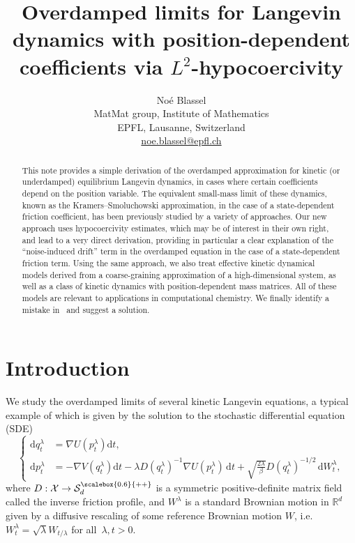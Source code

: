 \documentclass[10pt]{article}
\title{Overdamped limits for Langevin dynamics with position-dependent coefficients via $L^2$-hypocoercivity}
\author{No\'e Blassel\\
   \small{MatMat group, Institute of Mathematics}\\\small{EPFL, Lausanne, Switzerland}  \\
   \small{\href{mailto:noe.blassel@epfl.ch}{noe.blassel@epfl.ch}}
}
\renewcommand{\d}{\mathrm{d}}
\newcommand{\R}{\mathbb{R}}
\newcommand{\cX}{\mathcal{X}}
\newcommand{\cSpd}{\mathcal{S}_d^{\scalebox{0.6}{++}}}
\newcommand{\1}{\mathbbm 1}
\begin{document}
\maketitle

\begin{abstract}
    This note provides a simple derivation of the overdamped approximation for kinetic (or underdamped) equilibrium Langevin dynamics, in cases where certain coefficients depend on the position variable.
    The equivalent small-mass limit of these dynamics, known as the Kramers--Smoluchowski approximation, in the case of a state-dependent friction coefficient, has been previously studied by a variety of approaches.
    Our new approach uses hypocoercivity estimates, which may be of interest in their own right, and lead to a very direct derivation, providing in particular a clear explanation of the ``noise-induced drift'' term in the overdamped equation in the case of a state-dependent friction term.
    Using the same approach, we also treat effective kinetic dynamical models derived from a coarse-graining approximation of a high-dimensional system, as well as a class of kinetic dynamics with position-dependent mass matrices. All of these models are relevant to applications in computational chemistry.
    We finally identify a mistake in~\cite{WSW24} and suggest a solution.
\end{abstract}

\section{Introduction}
\label{sec:intro}

We study the overdamped limits of several kinetic Langevin equations, a typical example of which is given by the solution to the stochastic differential equation (SDE)
\begin{equation}
    \label{eq:underdamped_friction_dependent}
    \left\{
    \begin{aligned}
            \d q_t^\lambda &= \nabla U(p_t^\lambda) \d t,\\
            \d p_t^\lambda &= -\nabla V(q_t^\lambda) \d t - \lambda D(q_t^\lambda)^{-1}\nabla U(p_t^\lambda)\,\d t + \sqrt{\frac{2\lambda}{\beta}}D(q_t^\lambda)^{-1/2}\,\d W_t^\lambda,
        \end{aligned}
    \right.
\end{equation}
where $D:\cX\to \cSpd$ is a symmetric positive-definite matrix field called the inverse friction profile, and $W^\lambda$ is a standard Brownian motion in $\R^d$ given by a diffusive rescaling of some reference Brownian motion $W$, i.e. $W_t^\lambda = \sqrt{\lambda}W_{t/\lambda}$ for all~$\lambda,t>0$.
\end{document}
